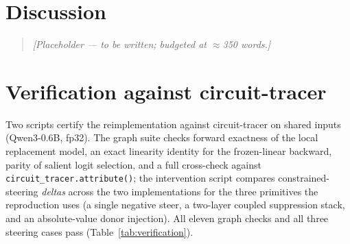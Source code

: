 \documentclass[11pt,a4paper]{article}
\newcommand{\placeholder}[1]{\begin{quote}\itshape\color{gray!60!black}#1\end{quote}}
\begin{document}
\section{Discussion}\label{sec:discussion}
\placeholder{[Placeholder --- to be written; budgeted at $\approx$350 words.]}

\clearpage



\appendix

\clearpage
\section{Verification against circuit-tracer}\label{app:verification}

Two scripts certify the reimplementation against circuit-tracer on shared inputs
(Qwen3-0.6B, fp32). The graph suite checks forward exactness of the local replacement
model, an exact linearity identity for the frozen-linear backward, parity of salient
logit selection, and a full cross-check against \texttt{circuit\_tracer.attribute()};
the intervention script compares constrained-steering \emph{deltas} across the two
implementations for the three primitives the reproduction uses (a single negative
steer, a two-layer coupled suppression stack, and an absolute-value donor injection).
All eleven graph checks and all three steering cases pass
(Table~\ref{tab:verification}).
\end{document}
